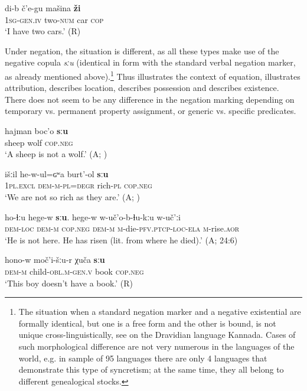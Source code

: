 \documentclass[output=paper,colorlinks=true, citecolor=brown]{langscibook}
\begin{document}
\ea
    \label{ex:and:24} 
    \gll di-b č’e-gu mašina \textbf{ži}\\
         \textsc{1sg}-\textsc{gen.iv} two-\textsc{num} car \textsc{cop} \\
    \glt ‘I have two cars.’ (R)
\z

Under negation, the situation is different, as all these types make use of the negative copula \textit{sːu} (identical in form with the standard verbal negation marker, as already mentioned above).\footnote{The situation when a standard negation marker and a negative existential are formally identical, but one is a free form and the other is bound, is not unique cross-linguistically, see \citet[113--114]{Veselinova2013neg.exist} on the Dravidian language Kannada. Cases of such morphological difference are not very numerous in the languages of the world, e.g. in  sample of 95 languages there are only 4 languages that demonstrate this type of syncretism; at the same time, they all belong to different genealogical stocks.} Thus  illustrates the context of equation,  illustrates attribution,  describes location,  describes possession and  describes existence. There does not seem to be any difference in the negation marking depending on temporary vs. permanent property assignment, or generic vs. specific predicates.

\ea\label{ex:and:25}
    \gll hajman boc’o \textbf{sːu}\\
          sheep wolf \textsc{cop.neg}\\
    \glt ‘A sheep is not a wolf.’ (A; )
\z 

\ea\label{ex:and:26}
    \gll išːil he-w-ul=ɢʷa burt’-ol \textbf{sːu}\\
          \textsc{1pl.excl} \textsc{dem-m-pl=degr} rich-\textsc{pl} \textsc{cop.neg}\\
    \glt ‘We are not so rich as they are.’ (A; )
\z 

\ea
    \label{ex:and:27}
    \gll ho{}-ɬːu hege{}-w \textbf{sːu}. hege{}-w w{}-uč’o{}-b{}-ɬu{}-kːu w{}-uč’ːi\\
          \textsc{dem-loc} \textsc{dem-m} \textsc{cop.neg} \textsc{dem-m} \textsc{m}{}-die-\textsc{pfv.ptcp-loc{}-ela} \textsc{m}-rise.\textsc{aor}\\
    \glt ‘He is not here. He has risen (lit. from where he died).’ (A;  24:6)
\z 

\ea\label{ex:and:28} 
    \gll hono{}-w moč’i{}-šːu{}-r χuča \textbf{sːu}\\
          \textsc{dem-m} child\textsc{{}-obl.m}{}-\textsc{gen.v} book \textsc{cop.neg}\\
    \glt ‘This boy doesn’t have a book.’ (R)
\z 
\end{document}
